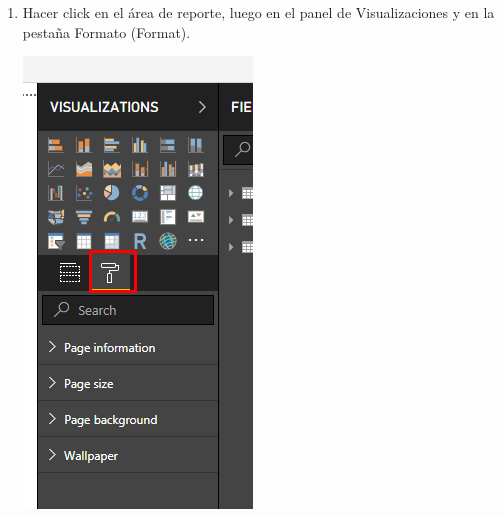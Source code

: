 \begin{itemize}
\begin{enumerate}
\item Hacer click en el área de reporte, luego en el panel de Visualizaciones y en la pestaña Formato (Format).
\begin{center}
\includegraphics[scale=0.55]{./Imagenes/20.png}
\end{center}


\end{enumerate}
\end{itemize}
